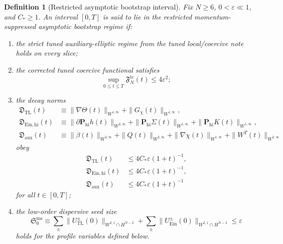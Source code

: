 \documentclass[11pt]{article}
\newtheorem{definition}{Definition}
\begin{document}
\begin{definition}[Restricted asymptotic bootstrap interval]
\label{def:boot}
Fix \(N\ge 6\), \(0<\varepsilon\ll 1\), and \(C_\ast\ge 1\). An interval \([0,T]\) is said to lie in the \emph{restricted momentum-suppressed asymptotic bootstrap regime} if:
\begin{enumerate}
    \item the strict tuned auxiliary-elliptic regime from the tuned local/coercive note holds on every slice;
    \item the corrected tuned coercive functional satisfies
    \begin{equation}
    \sup_{0\le t\le T}\mathfrak F_N^{\mathrm{tc}}(t)\le 4\varepsilon^2;
    \label{eq:Fboot}
    \end{equation}
    \item the decay norms
    \begin{align}
    \mathfrak D_{\mathrm{TL}}(t)
    &\equiv
    \|\nabla\Theta(t)\|_{W^{1,\infty}}
    + \|G_\chi(t)\|_{W^{1,\infty}},
    \label{eq:DTL}
    \\
    \mathfrak D_{\mathrm{Ein,hi}}(t)
    &\equiv
    \|\partial \mathbf P_{\mathrm{hi}}h(t)\|_{W^{2,\infty}}
    + \|\mathbf P_{\mathrm{hi}}\Sigma(t)\|_{W^{1,\infty}}
    + \|\mathbf P_{\mathrm{hi}}K(t)\|_{W^{1,\infty}},
    \label{eq:DEin}
    \\
    \mathfrak D_{\mathrm{aux}}(t)
    &\equiv
    \|\beta(t)\|_{W^{2,\infty}}
    + \|Q(t)\|_{W^{2,\infty}}
    + \|\nabla\chi(t)\|_{W^{1,\infty}}
    + \|W^T(t)\|_{W^{2,\infty}}
    \label{eq:Daux}
    \end{align}
    obey
    \begin{align}
    \mathfrak D_{\mathrm{TL}}(t)
    &\le 4C_\ast\varepsilon(1+t)^{-1},
    \label{eq:DTLboot}
    \\
    \mathfrak D_{\mathrm{Ein,hi}}(t)
    &\le 4C_\ast\varepsilon(1+t)^{-1},
    \label{eq:DEinboot}
    \\
    \mathfrak D_{\mathrm{aux}}(t)
    &\le 4C_\ast\varepsilon(1+t)^{-1}
    \label{eq:Dauxboot}
    \end{align}
    for all \(t\in[0,T]\);
    \item the low-order dispersive seed size
    \begin{equation}
    \mathfrak S_0^{\mathrm{ms}}
    \equiv
    \sum_{\pm}\|U_{\mathrm{TL}}^\pm(0)\|_{W^{2,1}\cap H^{N-2}}
    +
    \sum_{\pm}\|U_{\mathrm{Ein}}^\pm(0)\|_{W^{2,1}\cap H^{N-2}}
    \le \varepsilon
    \label{eq:S0}
    \end{equation}
    holds for the profile variables defined below.
\end{enumerate}
\end{definition}
\end{document}
